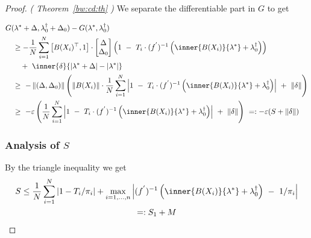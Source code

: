 \begin{proof}
  \emph{
    (
  Theorem~\ref{bw:cd:th}
    )
  }
 We separate the differentiable part in $G$ to get

 \begin{align*}
   &
   G
     (
     \lambda^*
      +
      \Delta
      ,
      \lambda^\dagger_0
      +
     \Delta_0
     )
     -
     G
     (
     \lambda^*,
      \lambda^\dagger_0
     )
     \\
     &
     \quad
     \ge
     -
     \frac{1}{N}
     \sum_{i=1}^{N} 
     \left[ 
       B(X_i)^\top,
       1
     \right]
     \cdot
     \begin{bmatrix}
       \Delta\\
       \Delta_0
     \end{bmatrix}
     \left( 
       1
       \ 
       -
       \ 
     T_i
     \cdot
     (f^{'})^{-1}
     \left( 
       \inner
       {B(X_i)}
       {\lambda^*}
       +
      \lambda^\dagger_0
     \right)
     \right)
     \\
     &
     \qquad
     +
     \ 
     \inner
     {\delta}
     {
       |\lambda^*+\Delta|
       -
       |\lambda^*|
     }
     \\
     &
     \quad
     \ge
     \ 
     -
       \norm{
         (
     \Delta
     ,
     \Delta_0
         )
 } 
     \left( 
     \norm{B(X_i)}
     \cdot
     \frac{1}{N}
     \sum_{i=1}^{N} 
     \left| 
       1
       \ 
       -
       \ 
     T_i
     \cdot
     (f^{'})^{-1}
     \left( 
       \inner
       {B(X_i)}
       {\lambda^*}
       +
      \lambda^\dagger_0
     \right)
     \right|
     \ 
     +
     \ 
     \norm{\delta}
     \right)
     \\
     &
     \quad
     \ge
     \ 
     -
     \varepsilon
     \left( 
     \frac{1}{N}
     \sum_{i=1}^{N} 
     \left| 
       1
       \ 
       -
       \ 
     T_i
     \cdot
     (f^{'})^{-1}
     \left( 
       \inner
       {B(X_i)}
       {\lambda^*}
       +
      \lambda^\dagger_0
     \right)
     \right|
     \ 
     +
     \ 
     \norm{\delta}
     \right)
     \ 
     =:
     -\varepsilon
     (S+\norm{\delta})
 \end{align*}
 \subsubsection*{Analysis of $S$}
 By the triangle inequality we get
 \begin{gather}
  S
  \le
  \frac{1}{N}
  \sum_{i=1}^{N} 
  |
  1
  -
  T_i
  /
  \pi_i
  |
  +
  \max_{i=1,\ldots,n}
     \left| 
     (f^{'})^{-1}
     \left( 
       \inner
       {B(X_i)}
       {\lambda^*}
       +
      \lambda^\dagger_0
     \right)
     \ 
      -
      \ 
      1/\pi_i
     \right|
     \\
     =:
     S_1
     +
     M
 \end{gather}


\end{proof}
